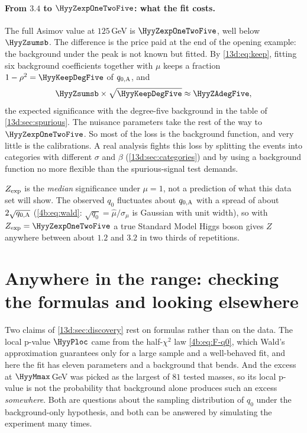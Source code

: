 \paragraph{From $3.4$ to $\HyyZexpOneTwoFive$: what the fit costs.}
The full Asimov value at $125\,$GeV is $\HyyZexpOneTwoFive$, well below $\HyyZsumsb$. The
difference is the price paid at the end of the opening example: the background under the
peak is not known but fitted. By \eqref{13d:eq:keep}, fitting six background coefficients
together with $\mu$ keeps a fraction $1-\rho^2=\HyyKeepDegFive$ of $q_{0,\rm A}$, and
\[
  \HyyZsumsb\times\sqrt{\HyyKeepDegFive}\approx\HyyZAdegFive ,
\]
the expected significance with the degree-five background in the table of
\cref{13d:sec:spurious}. The nuisance parameters take the rest of the way to
$\HyyZexpOneTwoFive$. So most of the loss is the background function, and very little is
the calibrations. A real analysis fights this loss by splitting the events into
categories with different $\sigma$ and $\beta$ (\cref{13d:sec:categories}) and by using a
background function no more flexible than the spurious-signal test demands.

\begin{pitfall}
$Z_{\rm exp}$ is the \emph{median} significance under $\mu=1$, not a prediction of what
this data set will show. The observed $q_0$ fluctuates about $q_{0,\rm A}$ with a spread of
about $2\sqrt{q_{0,\rm A}}$ (\cref{4b:eq:wald}: $\sqrt{q_0}=\hat\mu/\sigma_\mu$ is Gaussian
with unit width), so with $Z_{\rm exp}=\HyyZexpOneTwoFive$ a true Standard Model Higgs
boson gives $Z$ anywhere between about $1.2$ and $3.2$ in two thirds of repetitions.
\end{pitfall}
\section{Anywhere in the range: checking the formulas and looking elsewhere}
\label{13d:sec:lee}

Two claims of \cref{13d:sec:discovery} rest on formulas rather than on the data. The
local p-value $\HyyPloc$ came from the half-$\chi^2$ law \eqref{4b:eq:F-q0}, which Wald's
approximation guarantees only for a large sample and a well-behaved fit, and here the fit
has eleven parameters and a background that bends. And the excess at $\HyyMmax\,$GeV was
picked as the largest of $81$ tested masses, so its local p-value is not the probability
that background alone produces such an excess \emph{somewhere}. Both are questions about
the sampling distribution of $q_0$ under the background-only hypothesis, and both can be
answered by simulating the experiment many times.

